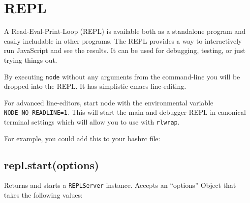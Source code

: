\section{REPL}

A Read-Eval-Print-Loop (REPL) is available both as a standalone program
and easily includable in other programs. The REPL provides a way to
interactively run JavaScript and see the results. It can be used for
debugging, testing, or just trying things out.

By executing \texttt{node} without any arguments from the command-line
you will be dropped into the REPL. It has simplistic emacs line-editing.

\begin{Shaded}
\begin{Highlighting}[]
  
\NormalTok{> a = [ }\NormalTok{, }\NormalTok{, }\NormalTok{];}
\NormalTok{[ }\NormalTok{, }\NormalTok{, } \NormalTok{]}
\NormalTok{> }\NormalTok{(} 
\end{Highlighting}
\end{Shaded}

For advanced line-editors, start node with the environmental variable
\texttt{NODE\_NO\_READLINE=1}. This will start the main and debugger
REPL in canonical terminal settings which will allow you to use with
\texttt{rlwrap}.

For example, you could add this to your bashrc file:

\begin{Shaded}
\begin{Highlighting}[]
\end{Highlighting}
\end{Shaded}

\subsection{repl.start(options)}

Returns and starts a \texttt{REPLServer} instance. Accepts an
``options'' Object that takes the following values:

